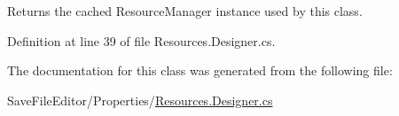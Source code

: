 Returns the cached Resource\+Manager instance used by this class. 



Definition at line 39 of file Resources.\+Designer.\+cs.



The documentation for this class was generated from the following file\+:\begin{DoxyCompactItemize}
\item 
Save\+File\+Editor/\+Properties/\hyperlink{_save_file_editor_2_properties_2_resources_8_designer_8cs}{Resources.\+Designer.\+cs}\end{DoxyCompactItemize}
